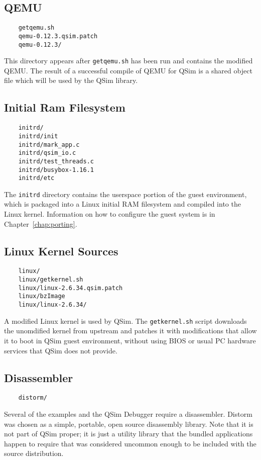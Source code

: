 \documentclass[letterpaper, 10pt]{book}
\begin{document}
\subsection{QEMU}
\begin{verbatim}
    getqemu.sh
    qemu-0.12.3.qsim.patch
    qemu-0.12.3/
\end{verbatim}
This directory appears after \texttt{getqemu.sh} has been run and contains the
modified QEMU. The result of a successful compile of QEMU for QSim is a shared
object file which will be used by the QSim library.

\subsection{Initial Ram Filesystem}
\begin{verbatim}
    initrd/
    initrd/init
    initrd/mark_app.c
    initrd/qsim_io.c
    initrd/test_threads.c
    initrd/busybox-1.16.1
    initrd/etc
\end{verbatim}
The \texttt{initrd} directory contains the userspace portion of the guest
environment, which is packaged into a Linux initial RAM filesystem and compiled
into the Linux kernel. Information on how to configure the guest system is in
Chapter~\ref{chap:porting}.

\subsection{Linux Kernel Sources}
\begin{verbatim}
    linux/
    linux/getkernel.sh
    linux/linux-2.6.34.qsim.patch
    linux/bzImage
    linux/linux-2.6.34/
\end{verbatim}
A modified Linux kernel is used by QSim. The \texttt{getkernel.sh} script
downloads the unomdified kernel from upstream and patches it with modifications
that allow it to boot in QSim guest environment, without using BIOS or usual PC
hardware services that QSim does not provide.

\subsection{Disassembler}
\begin{verbatim}
    distorm/
\end{verbatim}
Several of the examples and the QSim Debugger require a disassembler. Distorm 
was chosen as a simple, portable, open source disassembly library. Note that it
is not part of QSim proper; it is just a utility library that the bundled
applications happen to require that was considered uncommon enough to be
included with the source distribution.
\end{document}
